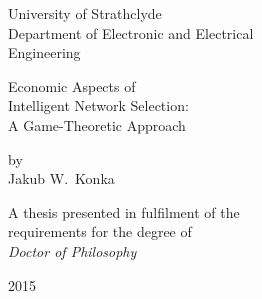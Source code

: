 \begin{titlepage}

{\centering

{\sffamily\Large University of Strathclyde}\\[1em]
{\sffamily\Large Department of Electronic and Electrical}\\
{\sffamily\Large Engineering}

\vspace*{3cm}

{\sffamily\Huge Economic Aspects of}\\[0.5em]
{\sffamily\Huge Intelligent Network Selection:}\\[0.5em]
{\sffamily\Huge A Game-Theoretic Approach}

\vspace{7cm}
{\sffamily by}\\[1em]
{\sffamily\LARGE Jakub W.~Konka}

\par
\vspace{3cm}

{\sffamily\Large A thesis presented in fulfilment of the}\\
{\sffamily\Large requirements for the degree of}\\[1em]
{\sffamily\Large \emph{Doctor of Philosophy}}

\par
\vspace{1cm}

{\sffamily\Large 2015}

}

\end{titlepage}
